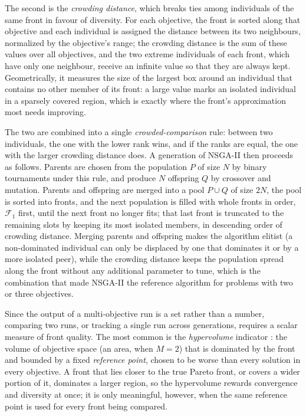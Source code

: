 The second is the \emph{crowding distance}, which breaks ties among individuals of the same front in favour of diversity. For each objective, the front is sorted along that objective and each individual is assigned the distance between its two neighbours, normalized by the objective's range; the crowding distance is the sum of these values over all objectives, and the two extreme individuals of each front, which have only one neighbour, receive an infinite value so that they are always kept. Geometrically, it measures the size of the largest box around an individual that contains no other member of its front: a large value marks an isolated individual in a sparsely covered region, which is exactly where the front's approximation most needs improving.

The two are combined into a single \emph{crowded-comparison} rule: between two individuals, the one with the lower rank wins, and if the ranks are equal, the one with the larger crowding distance does. A generation of NSGA-II then proceeds as follows. Parents are chosen from the population $P$ of size $N$ by binary tournaments under this rule, and produce $N$ offspring $Q$ by crossover and mutation. Parents and offspring are merged into a pool $P \cup Q$ of size $2N$, the pool is sorted into fronts, and the next population is filled with whole fronts in order, $\mathcal{F}_1$ first, until the next front no longer fits; that last front is truncated to the remaining slots by keeping its most isolated members, in descending order of crowding distance. Merging parents and offspring makes the algorithm elitist (a non-dominated individual can only be displaced by one that dominates it or by a more isolated peer), while the crowding distance keeps the population spread along the front without any additional parameter to tune, which is the combination that made NSGA-II the reference algorithm for problems with two or three objectives.

Since the output of a multi-objective run is a set rather than a number, comparing two runs, or tracking a single run across generations, requires a scalar measure of front quality. The most common is the \emph{hypervolume} indicator \cite{zitzler1999hypervolume}: the volume of objective space (an area, when $M=2$) that is dominated by the front and bounded by a fixed \emph{reference point}, chosen to be worse than every solution in every objective. A front that lies closer to the true Pareto front, or covers a wider portion of it, dominates a larger region, so the hypervolume rewards convergence and diversity at once; it is only meaningful, however, when the same reference point is used for every front being compared.


